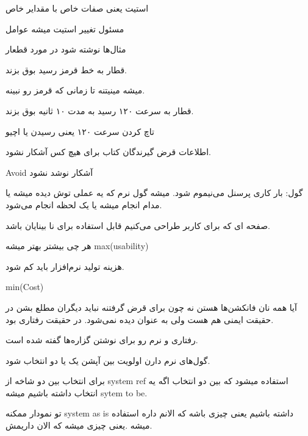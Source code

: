 استیت یعنی صفات خاص با مقدایر خاص

مسئول تغییر استیت میشه عوامل

مثال‌ها نوشته شود در مورد قطعار

قطار به خط قرمز رسید بوق بزند.

میشه مینیتنه تا زمانی که قرمز رو نبینه.

قطار به سرعت ۱۲۰ رسید به مدت ۱۰ ثانیه بوق بزند.

تاچ کردن سرعت ۱۲۰ یعنی رسیدن یا اچیو

اطلاعات قرض گیرندگان کتاب برای هیچ کس آشکار نشود.

Avoid آشکار نوشد نشود

گول: بار کاری پرسنل می‌نیموم شود. 
میشه گول نرم
که یه عملی توش دیده میشه
یا مدام انجام میشه
یا یک لحظه انجام می‌شود.

صفحه ای که برای کاربر طراحی می‌کنیم قابل استفاده برای نا بینایان باشد.

هر چی بیشتر بهتر میشه max(usability)

هزینه تولید نرم‌افزار باید کم شود.

min(Cost)

آیا همه نان فانکشن‌ها هستن نه
چون برای قرض گرفتنه نباید دیگران مطلع بشن در حقیقت ایمنی هم هست ولی به عنوان
 دیده نمی‌شود. در حقیقت رفتاری بود.

رفتاری و نرم رو برای نوشتن گزاره‌ها گفته شده است.

گول‌های نرم دارن اولویت بین آپشن یک یا دو انتخاب شود.

برای انتخاب بین دو شاخه از system ref استفاده میشود که بین دو انتخاب اگه یه
انتخاب داشته باشیم میشه sytem to be.

تو نمودار ممکنه system as is داشته باشیم یعنی چیزی باشه که الانم داره استفاده
میشه .یعنی چیزی میشه که الان داریمش.

